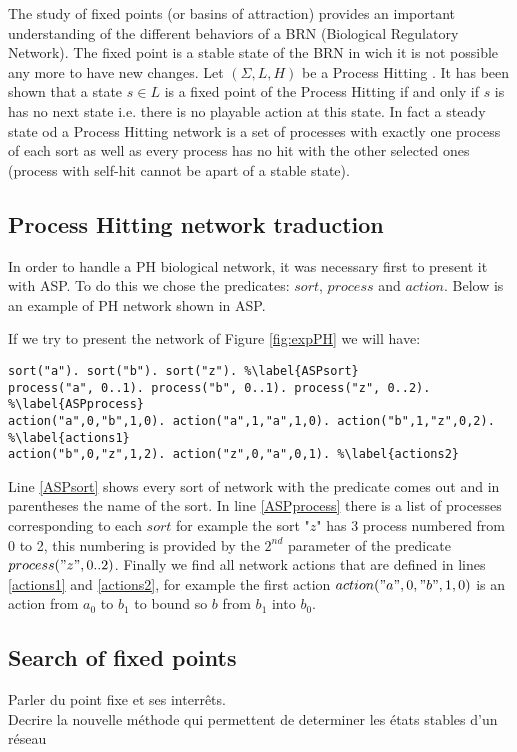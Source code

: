The study of fixed points (or basins of attraction) provides an important understanding of the different behaviors of a BRN (Biological Regulatory Network)\cite{wuensche1998genomic}.  
The fixed point is a stable state of the BRN in wich it is not possible any more to have new changes.
Let $(\Sigma, L, H)$ be a Process Hitting .
 It has been shown that a state $s \in L$ is a fixed point of the Process Hitting if and only if $s$ is has no next state \cite{pauleve2011modelisation} i.e. there is no playable action at this state. In fact a steady state od a Process Hitting network is a set of processes with exactly one process of each sort as well as every process has no hit with the other selected ones (process with self-hit cannot be apart of a stable state).

\subsection{Process Hitting network traduction }
In order to handle a PH biological network, it was necessary first to present it with ASP. To do this we chose the predicates: $sort$, $process$ and $action$. Below is an example of PH network shown in ASP.

\begin{exemple} 
If we try to present the network of Figure \ref{fig:expPH} we will have:
\begin{lstlisting}
sort("a"). sort("b"). sort("z"). %\label{ASPsort}
process("a", 0..1). process("b", 0..1). process("z", 0..2). %\label{ASPprocess}
action("a",0,"b",1,0). action("a",1,"a",1,0). action("b",1,"z",0,2). %\label{actions1}
action("b",0,"z",1,2). action("z",0,"a",0,1). %\label{actions2}
\end{lstlisting}
Line \ref{ASPsort} shows every sort of network with the predicate comes out and in parentheses the name of the sort. In line \ref{ASPprocess} there is a list of processes corresponding to each $sort$ for example the sort "$z$" has 3 process numbered from 0 to 2, this numbering is provided by the $2^{nd}$ parameter of the predicate $process("z", 0..2)$. Finally we find all network actions that are defined in lines \ref{actions1} and \ref{actions2}, for example the first action $action("a",0,"b",1,0)$ is an action from $a_0$ to $b_1$ to bound so $b$ from $b_1$ into $b_0$.
\end{exemple}

\subsection{Search of fixed points }
Parler du point fixe et ses interrêts. \\
Decrire la nouvelle méthode qui permettent de determiner les états stables d'un réseau 

